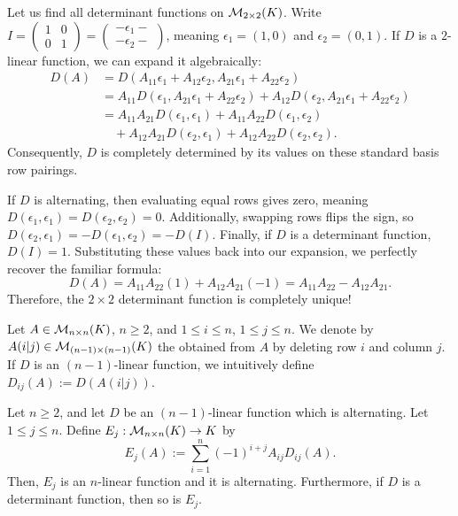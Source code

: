 \begin{example}[Warmup]
  Let us find all determinant functions on $\mathcal{M}_{2 \times 2}(K)$. Write $I = \left(\begin{smallmatrix} 1 & 0 \\ 0 & 1 \end{smallmatrix}\right) = \left(\begin{smallmatrix} -\epsilon_1- \\ -\epsilon_2- \end{smallmatrix}\right)$, meaning $\epsilon_1 = (1,0)$ and $\epsilon_2 = (0,1)$.
  If $D$ is a $2$-linear function, we can expand it algebraically:
  \begin{align*}
    D(A) &= D(A_{11}\epsilon_1 + A_{12}\epsilon_2, A_{21}\epsilon_1 + A_{22}\epsilon_2) \\
    &= A_{11} D(\epsilon_1, A_{21}\epsilon_1 + A_{22}\epsilon_2) + A_{12} D(\epsilon_2, A_{21}\epsilon_1 + A_{22}\epsilon_2) \\
    &= A_{11}A_{21}D(\epsilon_1, \epsilon_1) + A_{11}A_{22}D(\epsilon_1, \epsilon_2) \\
    &\quad + A_{12}A_{21}D(\epsilon_2, \epsilon_1) + A_{12}A_{22}D(\epsilon_2, \epsilon_2).
  \end{align*}
  Consequently, $D$ is completely determined by its values on these standard basis row pairings.

  If $D$ is alternating, then evaluating equal rows gives zero, meaning $D(\epsilon_1, \epsilon_1) = D(\epsilon_2, \epsilon_2) = 0$. Additionally, swapping rows flips the sign, so $D(\epsilon_2, \epsilon_1) = -D(\epsilon_1, \epsilon_2) = -D(I)$.
  Finally, if $D$ is a determinant function, $D(I) = 1$. Substituting these values back into our expansion, we perfectly recover the familiar formula:
  \[
  D(A) = A_{11}A_{22}(1) + A_{12}A_{21}(-1) = A_{11}A_{22} - A_{12}A_{21}.
  \]
  Therefore, the $2 \times 2$ determinant function is completely unique!
\end{example}

\begin{definition}[Submatrix]\label{def:minor_submatrix}
  Let $A \in \mathcal{M}_{n \times n}(K)$, $n \ge 2$, and $1 \le i \le n$, $1 \le j \le n$. We denote by $A(i|j) \in \mathcal{M}_{(n-1) \times (n-1)}(K)$ the  obtained from $A$ by deleting row $i$ and column $j$. If $D$ is an $(n-1)$-linear function, we intuitively define $D_{ij}(A) := D(A(i|j))$.
\end{definition}

\begin{theorem}\label{thm:recursive_det}
  Let $n \ge 2$, and let $D$ be an $(n-1)$-linear function which is alternating. Let $1 \le j \le n$. Define $E_j : \mathcal{M}_{n \times n}(K) \to K$ by
  \[
  E_j(A) := \sum_{i=1}^n (-1)^{i+j} A_{ij} D_{ij}(A).
  \]
  Then, $E_j$ is an $n$-linear function and it is alternating. Furthermore, if $D$ is a determinant function, then so is $E_j$.
\end{theorem}

